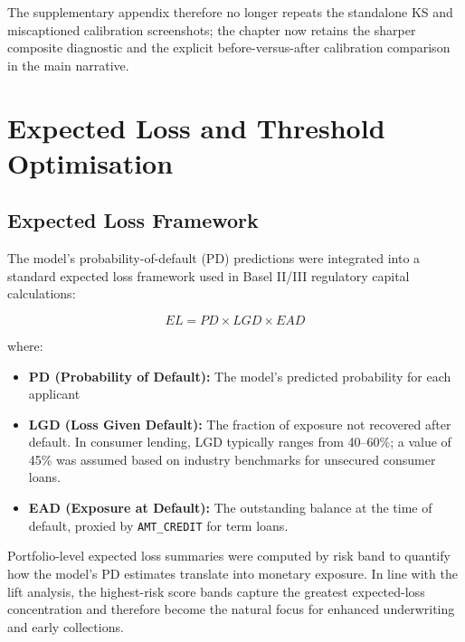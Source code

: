 

The supplementary appendix therefore no longer repeats the standalone KS and miscaptioned calibration screenshots; the chapter now retains the sharper composite diagnostic and the explicit before-versus-after calibration comparison in the main narrative.

\FloatBarrier

\section{Expected Loss and Threshold Optimisation}
\label{sec:expected_loss}

\subsection{Expected Loss Framework}

The model's probability-of-default (PD) predictions were integrated into a standard expected loss framework used in Basel II/III regulatory capital calculations:

\begin{equation}
EL = PD \times LGD \times EAD
\label{eq:expected_loss}
\end{equation}

where:
\begin{itemize}
    \item \textbf{PD (Probability of Default):} The model's predicted probability for each applicant
    \item \textbf{LGD (Loss Given Default):} The fraction of exposure not recovered after default. In consumer lending, LGD typically ranges from 40--60\%; a value of 45\% was assumed based on industry benchmarks for unsecured consumer loans.
    \item \textbf{EAD (Exposure at Default):} The outstanding balance at the time of default, proxied by \texttt{AMT\_CREDIT} for term loans.
\end{itemize}

Portfolio-level expected loss summaries were computed by risk band to quantify how the model's \ac{PD} estimates translate into monetary exposure. In line with the lift analysis, the highest-risk score bands capture the greatest expected-loss concentration and therefore become the natural focus for enhanced underwriting and early collections.


